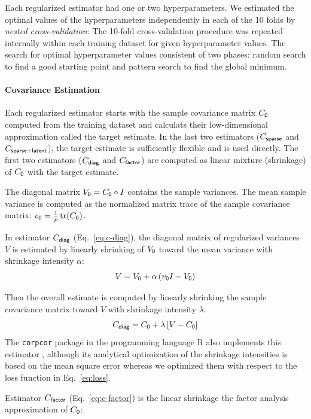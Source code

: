 \documentclass[10pt]{article}
\DeclareMathOperator{\Tr}{tr}
\begin{document}
Each regularized estimator had one or two hyperparameters.   We estimated the optimal values of the hyperparameters independently in each of the 10 folds by \emph{nested cross-validation}: The 10-fold cross-validation procedure was repeated internally within each training dataset for given hyperparameter values.  The search for optimal hyperparameter values consistent of two phases: random search to find a good starting point and pattern search to find the global minimum.

\paragraph{Covariance Estimation}
Each regularized estimator starts with the sample covariance matrix $C_{\sf 0}$ computed from the training dataset and calculats their low-dimensional approximation called the target estimate.  In the last two estimators ($C_{\sf sparse}$ and $C_{\sf sparse+latent}$), the target estimate is sufficiently flexible and is used directly.  The first two estimators ($C_{\sf diag}$ and $C_{\sf factor}$) are computed as linear mixture (shrinkage) of $C_{\sf 0}$ with the target estimate. 

The diagonal matrix $V_{\sf 0}=C_{\sf 0}\circ I$ contains the sample variances.  The mean sample variance is computed as the normalized matrix trace of the sample covariance matrix:  $v_{\sf 0} = \frac 1 p \Tr(C_{\sf 0})$.  

In estimator $C_{\sf diag}$ (Eq.~\ref{eq:c-diag}), the diagonal matrix of regularized variances $V$ is estimated by  linearly shrinking of $V_{\sf 0}$ toward the mean variance with shrinkage intensity $\alpha$:
\begin{equation}
V = V_0 + \alpha \left(v_{\sf 0} I - V_{\sf 0}\right)
\end{equation} 

Then the overall estimate is computed by linearly shrinking the sample covariance matrix toward $V$ with shrinkage intensity $\lambda$:
\begin{equation}
C_{\sf diag} = C_{\sf 0} + \lambda \left[V - C_{\sf 0}\right] 
\end{equation}
The {\tt corpcor} package in the programming language R also implements this estimator \cite{Schafer:2010}, although its analytical optimization of the shrinkage intensities is based on the mean square error whereas we optimized them with respect to the loss function in Eq.~\ref{eq:loss}.

Estimator $C_{\sf factor}$ (Eq.~\ref{eq:c-factor}) is the linear shrinkage the factor analysis approximation of $C_{\sf 0}$: 
\end{document}
